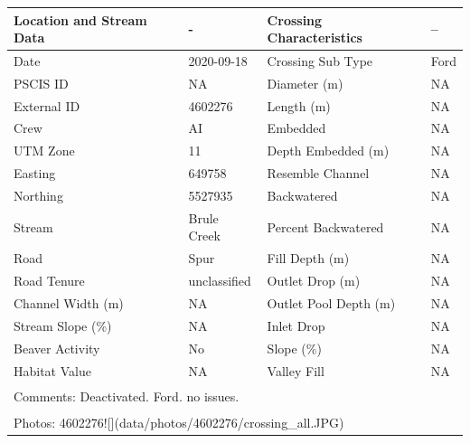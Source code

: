 \documentclass[
]{book}
\begin{document}
\begin{tabular}{llll}
\toprule
Location and Stream Data & - & Crossing Characteristics & --\\
\midrule
Date & 2020-09-18 & Crossing Sub Type & Ford\\
PSCIS ID & NA & Diameter (m) & NA\\
External ID & 4602276 & Length (m) & NA\\
Crew & AI & Embedded & NA\\
UTM Zone & 11 & Depth Embedded (m) & NA\\
\addlinespace
Easting & 649758 & Resemble Channel & NA\\
Northing & 5527935 & Backwatered & NA\\
Stream & Brule Creek & Percent Backwatered & NA\\
Road & Spur & Fill Depth (m) & NA\\
Road Tenure & unclassified & Outlet Drop (m) & NA\\
\addlinespace
Channel Width (m) & NA & Outlet Pool Depth (m) & NA\\
Stream Slope (\%) & NA & Inlet Drop & NA\\
Beaver Activity & No & Slope (\%) & NA\\
Habitat Value & NA & Valley Fill & NA\\
\bottomrule
\multicolumn{4}{l}{\textsuperscript{} Comments: Deactivated. Ford. no issues.}\\
\multicolumn{4}{l}{\textsuperscript{} Photos: 4602276![](data/photos/4602276/crossing\_all.JPG)}\\
\end{tabular}
\end{document}
